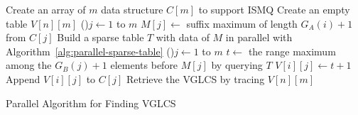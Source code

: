 \begin{algorithm}[!thb]
\SetAlgoNoLine
{}
    
Create an array of $m$ data structure $C[m]$ to support ISMQ \;
Create an empty table $V[n][m]$ \;
 {
  \ForPar(){$j \gets 1$ to $m$} {
    $M[j] \gets$ suffix maximum of length $G_A(i) + 1$ from $C[j]$ \;
  }
  Build a sparse table $T$ with data of $M$ in parallel with Algorithm~\ref{alg:parallel-sparse-table}\; 
  \ForPar(){$j \gets 1$ to $m$} {
     {
        $t \gets $ the range maximum among the $G_B(j) + 1$ elements before $M[j]$ by querying $T$ \;
        $V[i][j] \gets t + 1$ \;
        Append $V[i][j]$ to $C[j]$ \;
    }
  }
}
Retrieve the VGLCS by tracing $V[n][m]$ \;
  \caption{Parallel Algorithm for Finding VGLCS}
  \label{alg:parallel-VGLCS}
\end{algorithm}
